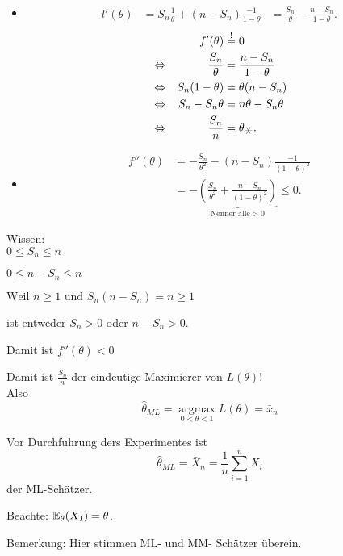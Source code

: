 \documentclass{tstextbook}
\begin{document}
\begin{example}
\begin{itemize}
	    \item \[
	\begin{aligned}
		l ' (\theta) & = {S_n} \frac{1}{\theta} + (n-S_n)\frac{-1}{1-\theta} 
		& = \frac{S_n}{\theta} -\frac{n-S_n}{1-\theta}.		
	\end{aligned}
	\]
\vspace{0.5cm}	
	\[
	\begin{aligned}
		&& f'(\theta)& \overset{!}{=} 0 \\
		& \Leftrightarrow & \frac{S_n}{\theta} & = \frac{n-S_n}{1-\theta} \\
		& \Leftrightarrow & S_n(1-\theta) & = \theta (n-S_n) \\
		& \Leftrightarrow & S_n -S_n \theta & = n\theta - S_n\theta \\
		& \Leftrightarrow & \frac{S_n}{n} & = \theta_{\hexstar}.
	\end{aligned}
	\]
\vspace{0.5cm}	
	    \item \[
	\begin{aligned}
		f''(\theta) & = -\frac{S_n}{\theta^2} -(n-S_n)\frac{-1}{(1-\theta)^2}\\
		& = - \underbrace{\left(\frac{S_n}{\theta^2}+\frac{n-S_n}{(1-\theta)^2}\right)}_{ \text{Nenner alle} >0 } \leq 0.	
	\end{aligned}
	\]
	
	\end{itemize} 
	
	Wissen: \\
	
	$ 0 \leq S_n \leq n$
	
	 $ 0 \leq n - S_n \leq n$
	
	$ \text{Weil } n \geq 1 \text{ und } S_n(n-S_n) =n \geq 1$
	
	ist entweder $ S_n >0 $ oder $n-S_n>0$. 
	
	Damit ist $f''(\theta)<0$
	
	Damit ist $\frac{S_n}{n}$ der eindeutige Maximierer von $L(\theta)$! \\
	

	Also 
	\[
	\hat{\theta}_{ML} = \underset{0< \theta <1}{\operatorname{argmax}} L({\theta}) = \bar{x}_n
	\]
	
	Vor Durchfuhrung ders Experimentes ist 
	\[
	\hat{\theta}_{ML} = \bar{X}_n = \frac{1}{n} \sum_{i=1}^{n} X_i
	\]
	der ML-Schätzer.
	
	Beachte: $ \mathbb E_{\theta}(X_1)=\theta $. 
	
	\begin{remark}
	Bemerkung: Hier stimmen ML- und MM- Schätzer überein.
	\end{remark}
	
\end{example}
\end{document}
